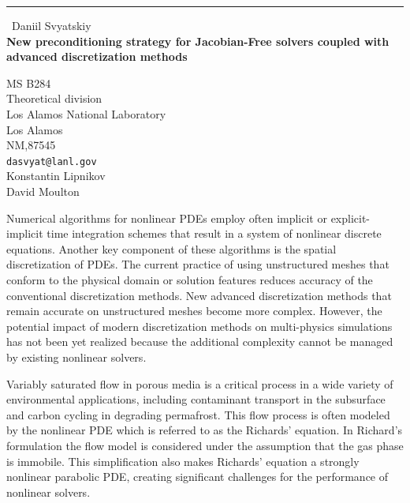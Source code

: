 \documentclass{report}
\begin{document}
\begin{center}
\rule{6in}{1pt} \
{\large Daniil Svyatskiy \\
{\bf New preconditioning strategy for Jacobian-Free solvers coupled with advanced discretization methods}}

MS B284 \\ Theoretical division \\ Los Alamos National Laboratory \\ Los Alamos \\ NM,87545
\\
{\tt dasvyat@lanl.gov}\\
Konstantin Lipnikov\\
David Moulton\end{center}

Numerical algorithms for nonlinear PDEs employ often implicit or explicit-implicit
time integration schemes that result in a system of nonlinear discrete
equations. Another key component of these algorithms is
the spatial discretization of PDEs. The current practice of using
unstructured meshes that conform to the physical domain or solution
features reduces accuracy
of the conventional discretization methods. New advanced discretization
methods that remain
accurate on unstructured meshes become more complex. However, the potential impact of
modern discretization methods on multi-physics simulations
has not been yet realized because the additional complexity
cannot be managed by existing nonlinear solvers.

Variably saturated flow in porous media is a critical process
in a wide variety of environmental applications, including
contaminant transport in the subsurface and carbon cycling in degrading
permafrost. This flow process is often modeled by the nonlinear
PDE which is referred to as the Richards' equation.
In Richard's formulation the flow model is
considered under the assumption that the gas phase is immobile.
This simplification also makes
Richards' equation a strongly nonlinear
parabolic PDE, creating significant
challenges for the performance of nonlinear solvers.
\end{document}

